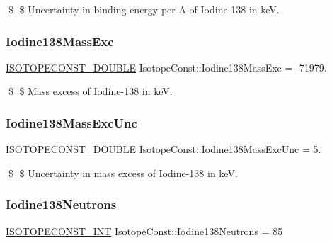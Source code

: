 \$ \$ Uncertainty in binding energy per A of Iodine-\/138 in keV. \mbox{\label{group___isotope_const-_iodine-_i138_ga56eb269495844d7b076bd7c8d8cefca3}} 
\subsubsection{\texorpdfstring{Iodine138\+Mass\+Exc}{Iodine138MassExc}}
{\footnotesize\ttfamily \mbox{\hyperlink{group___isotope_const-_macros_ga8f45a7272ce02c0b4c65c44636ed719a}{I\+S\+O\+T\+O\+P\+E\+C\+O\+N\+S\+T\+\_\+\+D\+O\+U\+B\+LE}} Isotope\+Const\+::\+Iodine138\+Mass\+Exc = -\/71979.}

\$ \$ Mass excess of Iodine-\/138 in keV. \mbox{\label{group___isotope_const-_iodine-_i138_ga412675a2a9a8f48e6fe83cf7d10f5f7f}} 
\subsubsection{\texorpdfstring{Iodine138\+Mass\+Exc\+Unc}{Iodine138MassExcUnc}}
{\footnotesize\ttfamily \mbox{\hyperlink{group___isotope_const-_macros_ga8f45a7272ce02c0b4c65c44636ed719a}{I\+S\+O\+T\+O\+P\+E\+C\+O\+N\+S\+T\+\_\+\+D\+O\+U\+B\+LE}} Isotope\+Const\+::\+Iodine138\+Mass\+Exc\+Unc = 5.}

\$ \$ Uncertainty in mass excess of Iodine-\/138 in keV. \mbox{\label{group___isotope_const-_iodine-_i138_gac5eba75cd54e804d6e2d204d09e30cc7}} 
\subsubsection{\texorpdfstring{Iodine138\+Neutrons}{Iodine138Neutrons}}
{\footnotesize\ttfamily \mbox{\hyperlink{group___isotope_const-_macros_ga5f18360b3e99483a35c32d789e62621c}{I\+S\+O\+T\+O\+P\+E\+C\+O\+N\+S\+T\+\_\+\+I\+NT}} Isotope\+Const\+::\+Iodine138\+Neutrons = 85}

